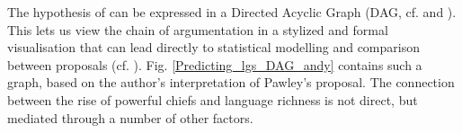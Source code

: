 \documentclass[unnumsec,webpdf,modern,medium]{oup-authoring-template}
\begin{document}


The hypothesis of \citet{pawley81, pawley2007} can be expressed in a Directed Acyclic Graph (DAG, cf. \citet{pearl1995causal} and \citet{mcelreath2020statistical}). This lets us view the chain of argumentation in a stylized and formal visualisation that can lead directly to statistical modelling and comparison between proposals (cf. \citet{roberts2020chield}). Fig. \ref{Predicting_lgs_DAG_andy} contains such a graph, based on the author's interpretation of Pawley's proposal. The connection between the rise of powerful chiefs and language richness is not direct, but mediated through a number of other factors. 
\end{document}
